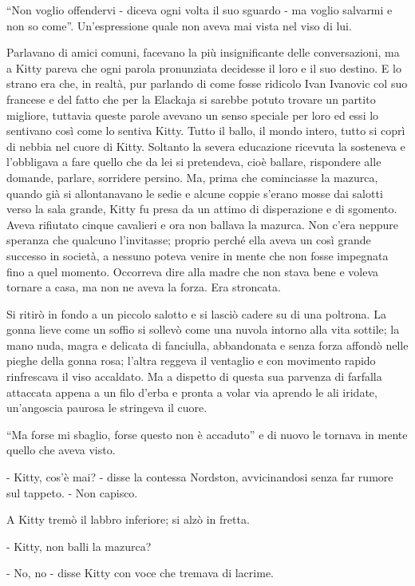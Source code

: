 ``Non voglio offendervi - diceva ogni volta il suo sguardo - ma voglio salvarmi e non so come''. Un'espressione quale non aveva mai vista nel viso di lui. 

Parlavano di amici comuni, facevano la più insignificante delle conversazioni, ma a Kitty pareva che ogni parola pronunziata decidesse il loro e il suo destino. E lo strano era che, in realtà, pur parlando di come fosse ridicolo Ivan Ivanovic col suo francese e del fatto che per la Elackaja si sarebbe potuto trovare un partito migliore, tuttavia queste parole avevano un senso speciale per loro ed essi lo sentivano così come lo sentiva Kitty. Tutto il ballo, il mondo intero, tutto si coprì di nebbia nel cuore di Kitty. Soltanto la severa educazione ricevuta la sosteneva e l'obbligava a fare quello che da lei si pretendeva, cioè ballare, rispondere alle domande, parlare, sorridere persino. Ma, prima che cominciasse la mazurca, quando già si allontanavano le sedie e alcune coppie s'erano mosse dai salotti verso la sala grande, Kitty fu presa da un attimo di disperazione e di sgomento. Aveva rifiutato cinque cavalieri e ora non ballava la mazurca. Non c'era neppure speranza che qualcuno l'invitasse; proprio perché ella aveva un così grande successo in società, a nessuno poteva venire in mente che non fosse impegnata fino a quel momento. Occorreva dire alla madre che non stava bene e voleva tornare a casa, ma non ne aveva la forza. Era stroncata. 

Si ritirò in fondo a un piccolo salotto e si lasciò cadere su di una poltrona. La gonna lieve come un soffio si sollevò come una nuvola intorno alla vita sottile; la mano nuda, magra e delicata di fanciulla, abbandonata e senza forza affondò nelle pieghe della gonna rosa; l'altra reggeva il ventaglio e con movimento rapido rinfrescava il viso accaldato. Ma a dispetto di questa sua parvenza di farfalla attaccata appena a un filo d'erba e pronta a volar via aprendo le ali iridate, un'angoscia paurosa le stringeva il cuore. 

``Ma forse mi sbaglio, forse questo non è accaduto'' e di nuovo le tornava in mente quello che aveva visto. 

- Kitty, cos'è mai? - disse la contessa Nordston, avvicinandosi senza far rumore sul tappeto. - Non capisco. 

A Kitty tremò il labbro inferiore; si alzò in fretta. 

- Kitty, non balli la mazurca? 

- No, no - disse Kitty con voce che tremava di lacrime. 

